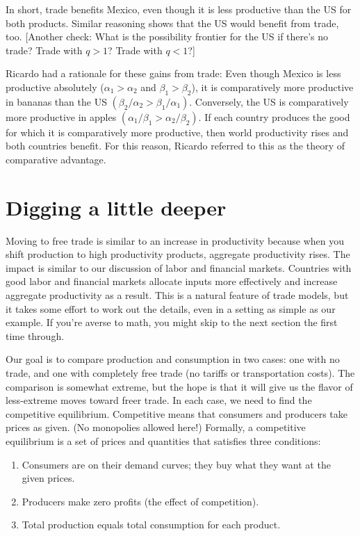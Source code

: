 
In short, trade benefits Mexico, even though it is less productive
than the US for both products.  Similar reasoning shows that the
US would benefit from trade, too.  [Another check:  What is the
possibility frontier for the US if there's no trade?
Trade with $q>1$?  Trade with $q<1$?]

Ricardo had a rationale for these gains from trade:  Even though
Mexico is less productive absolutely ($\alpha_{1}>\alpha_{2}$ and
$\beta_{1}>\beta_{2}$), it is comparatively more productive in
bananas than the US
$(\beta_{2}/\alpha_{2} > \beta_{1}/\alpha_{1})$.
Conversely, the US is comparatively more productive in apples
$ ( \alpha_{1}/\beta_{1} > \alpha_{2} /\beta_{2} )$.
If each country produces the good for which it is comparatively
more productive, then world productivity rises and both countries
benefit.
For this reason, Ricardo referred to this as the theory of comparative
advantage.


\section{Digging a little deeper}

Moving to free trade is similar to an
increase in productivity because when you shift production to high
productivity products, aggregate productivity rises.  The impact
is similar to our discussion of labor and financial markets.
Countries with good labor and financial markets allocate inputs
more effectively and increase aggregate productivity as a
result.  This is a natural feature of trade models, but it takes
some effort to work out the details, even in a setting as simple
as our example.  If you're averse to math, you might
skip to the next section the first time through.

Our goal is to compare production and consumption in two cases:
one with no trade, and one with completely free trade (no tariffs
or transportation costs).  The comparison is somewhat extreme, but
the hope is that it will give us the flavor of less-extreme moves
toward freer trade.  In each case, we need to find the competitive
equilibrium.  Competitive means that consumers and producers
take prices as given.  (No monopolies allowed here!)
Formally, a competitive equilibrium is a set of prices and
quantities that satisfies three conditions:
%
\begin{enumerate}
\item Consumers are on their demand curves;  they buy what they
want at the given prices.

\item Producers make zero profits (the effect of competition).

\item Total production equals total consumption for each product.
\end{enumerate}

